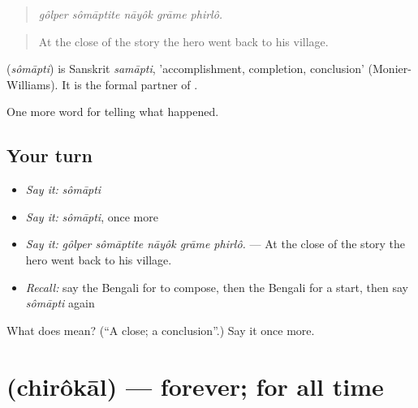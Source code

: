 \begin{quote}
    
\end{quote}

\begin{quote}
\emph{gôlper sômāptite nāyôk grāme phirlô.}
\end{quote}

\begin{quote}
At the close of the story the hero went back to his village.
\end{quote}

\begin{cousinweb}
\textbf{} (\emph{sômāpti}) is Sanskrit \emph{samāpti}, 'accomplishment, completion, conclusion' (Monier-Williams). It is the formal partner of \textbf{}.
\end{cousinweb}

\begin{grammarlens}[title={What you've built}]
One more word for telling what happened.
\end{grammarlens}

\subsection*{Your turn}
\begin{itemize}
\raggedright
  \item \emph{Say it:} \emph{sômāpti}
  \item \emph{Say it:} \emph{sômāpti}, once more
  \item \emph{Say it:} \emph{gôlper sômāptite nāyôk grāme phirlô.} — At the close of the story the hero went back to his village.
  \item \emph{Recall:} say the Bengali for to compose, then the Bengali for a start, then say \emph{sômāpti} again
\end{itemize}

\begin{tcolorbox}[breakable,colback=teal!4,colframe=teal!35!black,title={Before you move on}]
What does  mean? (\textquotedblleft{}A close; a conclusion\textquotedblright{}.) Say it once more.
\end{tcolorbox}
\section[\texorpdfstring{\bn{চিরকাল} (chirôkāl)}{চিরকাল (chirôkāl)}]{ (chirôkāl) — forever; for all time}

